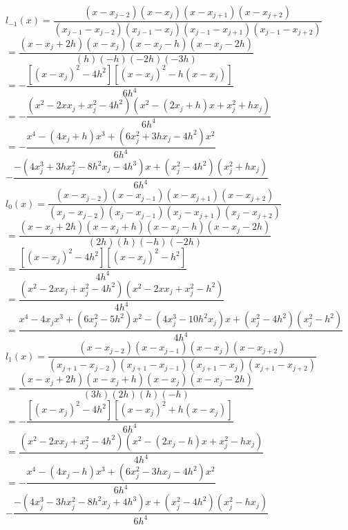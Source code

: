 \documentclass[14pt,a4paper]{article}
\begin{document}
\begin{enumerate}
	
	$l_{-1}(x) = \dfrac{(x-x_{j-2})(x-x_j)(x-x_{j+1})(x-x_{j+2})}{(x_{j-1}-x_{j-2})(x_{j-1}-x_j)(x_{j-1}-x_{j+1})(x_{j-1}-x_{j+2})} $\\
	\hspace*{1.1cm} $= \dfrac{(x-x_j +2h)(x-x_j)(x-x_j-h)(x-x_j-2h)}{(h)(-h)(-2h)(-3h)}$\\
	\hspace*{1.1cm} $= -\dfrac{[(x-x_j)^2 -4h^2][(x-x_j)^2 -h(x-x_j)]}{6h^4} $\\
	\hspace*{1.1cm} $= -\dfrac{(x^2 - 2xx_j + x_j^2 -4h^2)(x^2 - (2x_j+h)x +x_j^2 +hx_j)}{6h^4}$\\
	\hspace*{1.1cm} $= -\dfrac{x^4 -(4x_j+h)x^3 +(6x_j^2 +3hx_j-4h^2)x^2}{6h^4}$\\
	\hspace*{1.7cm} $- \dfrac{-(4x_j^3 +3hx_j^2-8h^2x_j-4h^3)x +(x_j^2-4h^2)(x_j^2+hx_j)}{6h^4}$\\
	
	
	$l_0(x) = \dfrac{(x-x_{j-2})(x-x_{j-1})(x-x_{j+1})(x-x_{j+2})}{(x_j-x_{j-2})(x_j-x_{j-1})(x_j-x_{j+1})(x_j-x_{j+2})} $\\
	\hspace*{0.8cm} $= \dfrac{(x-x_j +2h)(x-x_j+h)(x-x_j-h)(x-x_j-2h)}{(2h)(h)(-h)(-2h)}$\\
	\hspace*{0.8cm} $= \dfrac{[(x-x_j)^2 -4h^2][(x-x_j)^2 -h^2]}{4h^4} $\\
	\hspace*{0.8cm} $= \dfrac{(x^2 - 2xx_j + x_j^2 -4h^2)(x^2 - 2xx_j +x_j^2 -h^2)}{4h^4}$\\
	\hspace*{0.8cm} $= \dfrac{x^4 -4x_jx^3 +(6x_j^2-5h^2)x^2 -(4x_j^3-10h^2x_j)x +(x_j^2-4h^2)(x_j^2-h^2)}{4h^4}$\\
	
	$l_1(x) = \dfrac{(x-x_{j-2})(x-x_{j-1})(x-x_j)(x-x_{j+2})}{(x_{j+1}-x_{j-2})(x_{j+1}-x_{j-1})(x_{j+1}-x_j)(x_{j+1}-x_{j+2})} $\\
	\hspace*{0.8cm} $= \dfrac{(x-x_j +2h)(x-x_j+h)(x-x_j)(x-x_j-2h)}{(3h)(2h)(h)(-h)}$\\
	\hspace*{0.8cm} $= -\dfrac{[(x-x_j)^2 -4h^2][(x-x_j)^2 +h(x-x_j)]}{6h^4} $\\
	\hspace*{0.8cm} $= \dfrac{(x^2 - 2xx_j + x_j^2 -4h^2)(x^2 - (2x_j-h)x +x_j^2 -hx_j)}{4h^4}$\\
	\hspace*{0.8cm}$ = -\dfrac{x^4 -(4x_j-h)x^3 +(6x_j^2 -3hx_j-4h^2)x^2}{6h^4}$\\
	\hspace*{1.7cm} $- \dfrac{-(4x_j^3 -3hx_j^2-8h^2x_j+4h^3)x +(x_j^2-4h^2)(x_j^2-hx_j)}{6h^4}$\\
	

\end{enumerate}
\end{document}
